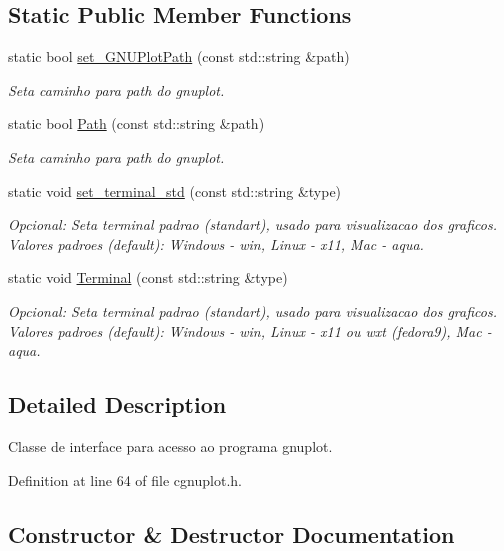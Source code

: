 \subsection*{Static Public Member Functions}
\begin{DoxyCompactItemize}
\item 
static bool \hyperlink{class_gnuplot_a67cae885c26ced821e335d98986f1967}{set\+\_\+\+G\+N\+U\+Plot\+Path} (const std\+::string \&path)
\begin{DoxyCompactList}\small\item\em Seta caminho para path do gnuplot. \end{DoxyCompactList}\item 
static bool \hyperlink{class_gnuplot_a3920eab5d6595ea80d4bc4f72b06dab1}{Path} (const std\+::string \&path)
\begin{DoxyCompactList}\small\item\em Seta caminho para path do gnuplot. \end{DoxyCompactList}\item 
static void \hyperlink{class_gnuplot_a21feba7a3916708b742c3dc25850ab2f}{set\+\_\+terminal\+\_\+std} (const std\+::string \&type)
\begin{DoxyCompactList}\small\item\em Opcional\+: Seta terminal padrao (standart), usado para visualizacao dos graficos. Valores padroes (default)\+: Windows -\/ win, Linux -\/ x11, Mac -\/ aqua. \end{DoxyCompactList}\item 
static void \hyperlink{class_gnuplot_a4039b0fdcf0e3fbf97dac187825138fb}{Terminal} (const std\+::string \&type)
\begin{DoxyCompactList}\small\item\em Opcional\+: Seta terminal padrao (standart), usado para visualizacao dos graficos. Valores padroes (default)\+: Windows -\/ win, Linux -\/ x11 ou wxt (fedora9), Mac -\/ aqua. \end{DoxyCompactList}\end{DoxyCompactItemize}


\subsection{Detailed Description}
Classe de interface para acesso ao programa gnuplot. 

Definition at line 64 of file cgnuplot.\+h.



\subsection{Constructor \& Destructor Documentation}
\mbox{\label{class_gnuplot_a187eb517b362cf379492fe7f1621ee50}} 
